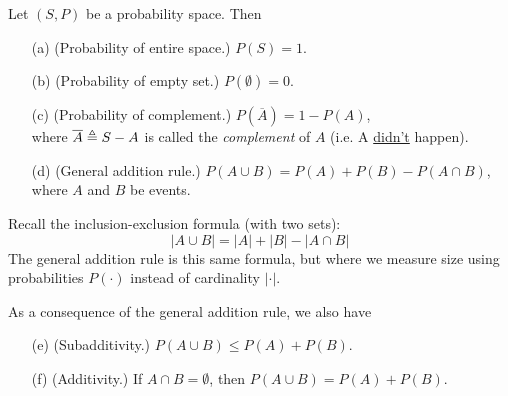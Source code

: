 \documentclass[10pt]{beamer}
\begin{document}
\begin{frame}
\footnotesize 
\begin{mygreenbox}[title=\text{Proposition: Basic Properties of Probability}]
Let $(S,P)$ be a probability space. Then
\begin{itemize}
	\item[(a)] (Probability of entire space.) $P(S)=1$. 
	\item[(b)] (Probability of empty set.)  $P(\emptyset)=0$. 
	\item[(c)] (Probability of complement.) $P(\overline{A}) = 1-P(A)$, \\
		where $\overline{A} \triangleq S-A$ is called the \textit{complement} of $A$ (i.e. A \underline{didn't} happen).
	\item[(d)]  (General addition rule.)  $P(A \cup B) = P(A) + P(B) - P(A \cap B)$, \\
	where $A$ and $B$ be events.
\end{itemize}
\end{mygreenbox}

\pause 
\vfill 
\begin{myredbox}[title=\text{Remark: General Addition Rule As Inclusion-Exclusion}]
Recall the inclusion-exclusion formula (with two sets):
\[ |A \cup B| = |A| + |B| - |A \cap B|\]
The general addition rule is this same formula, but where we measure size using probabilities $P(\cdot)$ instead of cardinality $|\cdot|$.
\end{myredbox}

\pause 
\vfill 
\begin{myyellowbox}[title=\text{Additional properties}]
As a consequence of the  general addition rule, we also have
\begin{itemize}
	\item[(e)] (Subadditivity.) $P(A \cup B) \leq P(A) + P(B)$. 
	\item[(f)] (Additivity.) If $A \cap B = \emptyset$, then  $P(A \cup B) = P(A) + P(B)$.
\end{itemize}
\end{myyellowbox}

\end{frame}
\end{document}
